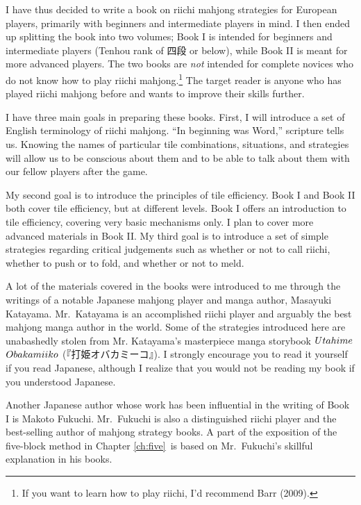 \bigskip
I have thus decided to write a book on riichi mahjong strategies for European players, primarily with beginners and intermediate players in mind. I then ended up splitting the book into two volumes; Book I is intended for beginners and intermediate players ({\jap Tenhou} rank of 四段 or below), while Book II is meant for more advanced players. The two books are \emph{not} intended for complete novices who do not know how to play riichi mahjong.\footnote{If you want to learn how to play riichi, I'd recommend Barr (2009).} The target reader is anyone who has played riichi mahjong before and wants to improve their skills further.

\bigskip
I have three main goals in preparing these books. First, I will introduce a set of English terminology of riichi mahjong.
``In beginning was Word,'' scripture tells us. Knowing the names of particular tile combinations, situations, and strategies will allow us to be conscious about them and to be able to talk about them with our fellow players after the game.

\bigskip
My second goal is to introduce the principles of tile efficiency.
Book I and Book II both cover tile efficiency, but at different levels. Book I offers an introduction to tile efficiency, covering very basic mechanisms only. I plan to cover more advanced materials in Book II.
My third goal is to introduce a set of simple strategies regarding critical judgements such as whether or not to call {\jap riichi}, whether to push or to fold, and whether or not to meld.

\bigskip
A lot of the materials covered in the books were introduced to me through the writings of a notable Japanese mahjong player and manga author, Masa\-yuki Kata\-yama. Mr.~Kata\-yama is an accomplished riichi player and arguably the best mahjong manga author in the world. Some of the strategies introduced here are unabashedly stolen from Mr. Kata\-yama's masterpiece manga storybook $Uta\-hime$ $Obaka\-miiko$ (『打姫\-オバカ\-ミーコ』).
I strongly encourage you to read it yourself if you read Japanese, although I realize that you would not be reading my book if you understood Japanese.

\bigskip
Another Japanese author whose work has been influential in the writing of Book I is Makoto Fukuchi. Mr.~Fukuchi is also a distinguished riichi player and the best-selling author of mahjong strategy books. A part of the exposition of the five-block method in Chapter \ref{ch:five}~is based on Mr.~Fukuchi's skillful explanation in his books. 

